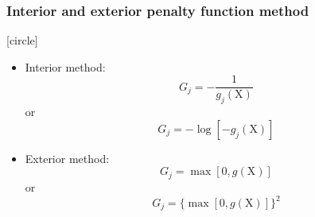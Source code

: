 \documentclass{beamer}
\begin{document}
\begin{frame}
    \frametitle{Interior and exterior penalty function method}
    [circle]
    \begin{itemize}
        \item Interior method:
        $$G_j=-\frac{1}{g_j(\textrm{X})}$$ or
        $$G_j=-\log[-g_j(\textrm{X})]$$
        \item Exterior method:
        $$G_j=\max[0, g(\textrm{X})]$$ or
        $$G_j=\{\max[0, g(\textrm{X})]\}^2$$
    \end{itemize}
    
\end{frame}
\end{document}
